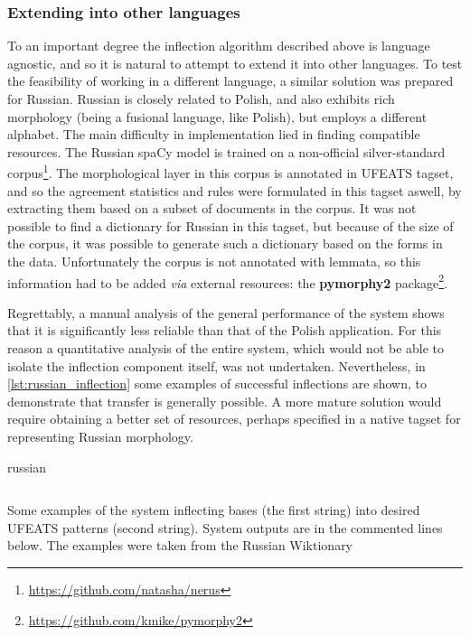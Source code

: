 \documentclass[12pt]{article}
\begin{document}
\subsubsection{Extending into other languages}

To an important degree the inflection algorithm described above is language agnostic, and so it is natural to attempt to extend it into other languages. To test the feasibility of working in a different language, a similar solution was prepared for Russian. Russian is closely related to Polish, and also exhibits rich morphology (being a fusional language, like Polish), but employs a different alphabet. The main difficulty in implementation lied in finding compatible resources. The Russian spaCy model is trained on a non-official silver-standard corpus\footnote{\url{https://github.com/natasha/nerus}}. The morphological layer in this corpus is annotated in UFEATS tagset, and so the agreement statistics and rules were formulated in this tagset aswell, by extracting them based on a subset of documents in the corpus. It was not possible to find a dictionary for Russian in this tagset, but because of the size of the corpus, it was possible to generate such a dictionary based on the forms in the data. Unfortunately the corpus is not annotated with lemmata, so this information had to be added \textit{via} external resources: the \textbf{pymorphy2} package\footnote{\url{https://github.com/kmike/pymorphy2}}. 

Regrettably, a manual analysis of the general performance of the system shows that it is significantly less reliable than that of the Polish application. For this reason a quantitative analysis of the entire system, which would not be able to isolate the inflection component itself, was not undertaken. Nevertheless, in \autoref{lst:russian_inflection} some examples of successful inflections are shown, to demonstrate that transfer is generally possible. A more mature solution would require obtaining a better set of resources, perhaps specified in a native tagset for representing Russian morphology.

\begin{listing}[H]
\small
{} 
\begin{otherlanguage*}{russian}
\inputminted[linenos,tabsize=2,breaklines]{Python}{russian_tests_snippet.py}
\end{otherlanguage*}
\caption{Some examples of the system inflecting bases (the first string) into desired UFEATS patterns (second string). System outputs are in the commented lines below. The examples were taken from the Russian Wiktionary}
\label{lst:russian_inflection}
\end{listing}
\end{document}
